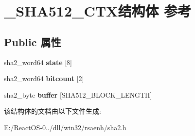 \hypertarget{struct___s_h_a512___c_t_x}{}\section{\+\_\+\+S\+H\+A512\+\_\+\+C\+T\+X结构体 参考}
\label{struct___s_h_a512___c_t_x}
\subsection*{Public 属性}
\begin{DoxyCompactItemize}
\item 
\mbox{\label{struct___s_h_a512___c_t_x_a8a6a67ecf8dd1ac4bb0217a92834597a}} 
sha2\+\_\+word64 {\bfseries state} \mbox{[}8\mbox{]}
\item 
\mbox{\label{struct___s_h_a512___c_t_x_a67eb31861d305f927fa9513c06350723}} 
sha2\+\_\+word64 {\bfseries bitcount} \mbox{[}2\mbox{]}
\item 
\mbox{\label{struct___s_h_a512___c_t_x_a4cc38479583ffe823b47c4793a76ef3e}} 
sha2\+\_\+byte {\bfseries buffer} \mbox{[}S\+H\+A512\+\_\+\+B\+L\+O\+C\+K\+\_\+\+L\+E\+N\+G\+TH\mbox{]}
\end{DoxyCompactItemize}


该结构体的文档由以下文件生成\+:\begin{DoxyCompactItemize}
\item 
E\+:/\+React\+O\+S-\/0../dll/win32/rsaenh/sha2.\+h\end{DoxyCompactItemize}
